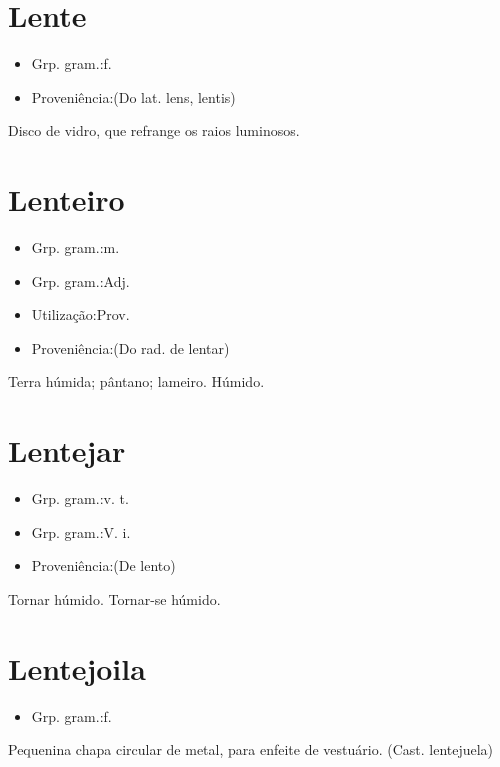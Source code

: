 \section{Lente}
\begin{itemize}
\item {Grp. gram.:f.}
\end{itemize}
\begin{itemize}
\item {Proveniência:(Do lat. \textunderscore lens\textunderscore , \textunderscore lentis\textunderscore )}
\end{itemize}
Disco de vidro, que refrange os raios luminosos.
\section{Lenteiro}
\begin{itemize}
\item {Grp. gram.:m.}
\end{itemize}
\begin{itemize}
\item {Grp. gram.:Adj.}
\end{itemize}
\begin{itemize}
\item {Utilização:Prov.}
\end{itemize}
\begin{itemize}
\item {Proveniência:(Do rad. de \textunderscore lentar\textunderscore )}
\end{itemize}
Terra húmida; pântano; lameiro.
Húmido.
\section{Lentejar}
\begin{itemize}
\item {Grp. gram.:v. t.}
\end{itemize}
\begin{itemize}
\item {Grp. gram.:V. i.}
\end{itemize}
\begin{itemize}
\item {Proveniência:(De \textunderscore lento\textunderscore )}
\end{itemize}
Tornar húmido.
Tornar-se húmido.
\section{Lentejoila}
\begin{itemize}
\item {Grp. gram.:f.}
\end{itemize}
Pequenina chapa circular de metal, para enfeite de vestuário.
(Cast. \textunderscore lentejuela\textunderscore )
